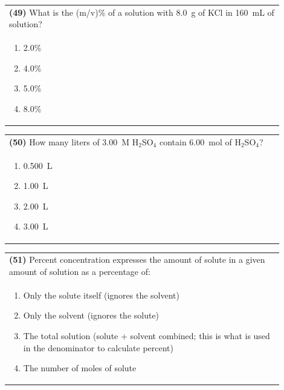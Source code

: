 \documentclass{article}
\begin{document}
\noindent\begin{tabular}{|p{0.9\linewidth}|}
\hline
\textbf{(49)} What is the (m/v)\% of a solution with 8.0~g of KCl in 160~mL of solution?\\[0.2cm]
\begin{minipage}[t]{0.85\linewidth}
\begin{enumerate}[label=\alph*.]
\item 2.0\%
\item 4.0\%
\item 5.0\%
\item 8.0\%
\end{enumerate}
\end{minipage}\\[0.2cm]
\hline
\end{tabular}

\noindent\begin{tabular}{|p{0.9\linewidth}|}
\hline
\textbf{(50)} How many liters of 3.00~M H$_2$SO$_4$ contain 6.00~mol of H$_2$SO$_4$?\\[0.2cm]
\begin{minipage}[t]{0.85\linewidth}
\begin{enumerate}[label=\alph*.]
\item 0.500~L
\item 1.00~L
\item 2.00~L
\item 3.00~L
\end{enumerate}
\end{minipage}\\[0.2cm]
\hline
\end{tabular}

\noindent\begin{tabular}{|p{0.9\linewidth}|}
\hline
\textbf{(51)} Percent concentration expresses the amount of solute in a given amount of solution as a percentage of:\\[0.2cm]
\begin{minipage}[t]{0.85\linewidth}
\begin{enumerate}[label=\alph*.]
\item Only the solute itself (ignores the solvent)
\item Only the solvent (ignores the solute)
\item The total solution (solute + solvent combined; this is what is used in the denominator to calculate percent)
\item The number of moles of solute
\end{enumerate}
\end{minipage}\\[0.2cm]
\hline
\end{tabular}
\end{document}
